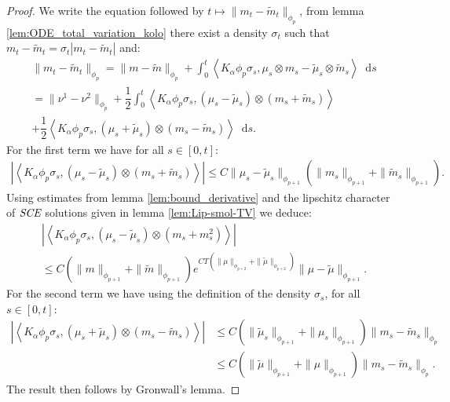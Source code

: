 \documentclass[11pt,a4paper]{article}
\newcommand{\SCE}{\emph{SCE}}
\newcommand{\brac}[1]{\left\langle#1\right\rangle}
\newcommand{\dd}{\mathop{}\!\mathrm{d}}
\begin{document}
\begin{proof}
    We write the equation followed by $t \mapsto \| m_t - \tilde{m}_t \|_{\phi_p}$, from lemma \ref{lem:ODE_total_variation_kolo} there exist a density $\sigma_t$ such that $m_t - \tilde{m}_t = \sigma_t|m_t - \tilde{m}_t|$ and:
    \begin{multline*}
        \| m_t - \tilde{m}_t \|_{\phi_p} = \|m-\tilde{m} \|_{\phi_{p}} + \int_0^t \brac{K_\alpha\phi_p\sigma_s, \mu_s\otimes m_s - \tilde{\mu}_s\otimes \tilde{m}_s} \dd s \\
        = \|\nu^1- \nu^2 \|_{\phi_{p}} + \dfrac12\int_0^t \brac{K_\alpha\phi_p\sigma_s, (\mu_s - \tilde{\mu}_s)\otimes (m_s + \tilde{m}_s) } \\
        + \dfrac12\brac{K_\alpha\phi_p\sigma_s, (\mu_s + \tilde{\mu}_s)\otimes (m_s - \tilde{m}_s)} \dd s.
    \end{multline*}
    For the first term we have for all $s \in [0,t]$:
    \begin{align*}
        \left| \brac{K_\alpha\phi_p\sigma_s, (\mu_s - \tilde{\mu}_s)\otimes (m_s + \tilde{m}_s)}\right| \leq C\| \mu_s - \tilde{\mu}_s\|_{\phi_{p+1}} \left(\| m_s\|_{\phi_{p+1}} + \| \tilde{m}_s\|_{\phi_{p+1}}\right).
    \end{align*}
    Using estimates from lemma \ref{lem:bound_derivative} and the lipschitz character of $\SCE$ solutions given in lemma \ref{lem:Lip-smol-TV} we deduce:
    \begin{multline*}
        \left| \brac{K_\alpha\phi_p\sigma_s, (\mu_s - \tilde{\mu}_s)\otimes (m_s + m_s^2) }\right| \\
        \leq C(\|m\|_{\phi_{p+1}}+ \|\tilde{m}\|_{\phi_{p+1}})e^{CT\left(\|\mu\|_{\phi_{p +2}} + \|\tilde{\mu}\|_{\phi_{p +2}}\right)} \|\mu - \tilde{\mu}\|_{\phi_{p+1}}.
    \end{multline*}
    For the second term we have using the definition of the density $\sigma_s$, for all $s \in [0,t]$:
    \begin{align*}
        \left| \brac{K_\alpha\phi_p\sigma_s, (\mu_s + \tilde{\mu}_s)\otimes (m_s - \tilde{m}_s)} \right| 
        &\leq C \left(\| \tilde{\mu}_s\|_{\phi_{p+1}} + \| \mu_s\|_{\phi_{p+1}}\right)\|m_s - \tilde{m}_s \|_{\phi_p} \\
        &\leq C \left(\| \tilde{\mu}\|_{\phi_{p+1}} + \| \mu\|_{\phi_{p+1}}\right)\|m_s - \tilde{m}_s \|_{\phi_p}.
    \end{align*}
    The result then follows by Gronwall's lemma.
\end{proof}
\end{document}
